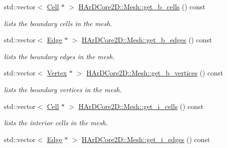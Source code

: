 \begin{DoxyCompactItemize}
\mbox{\label{group__Mesh_gaf5cd4923da2e5abbe05c0f473e3b9c8f}} 
std\+::vector$<$ \hyperlink{classHArDCore2D_1_1Cell}{Cell} $\ast$ $>$ \hyperlink{group__Mesh_gaf5cd4923da2e5abbe05c0f473e3b9c8f}{H\+Ar\+D\+Core2\+D\+::\+Mesh\+::get\+\_\+b\+\_\+cells} () const
\begin{DoxyCompactList}\small\item\em lists the boundary cells in the mesh. \end{DoxyCompactList}\item 
\mbox{\label{group__Mesh_gad876c80b23ab0c0d490b5dc8a60172b4}} 
std\+::vector$<$ \hyperlink{classHArDCore2D_1_1Edge}{Edge} $\ast$ $>$ \hyperlink{group__Mesh_gad876c80b23ab0c0d490b5dc8a60172b4}{H\+Ar\+D\+Core2\+D\+::\+Mesh\+::get\+\_\+b\+\_\+edges} () const
\begin{DoxyCompactList}\small\item\em lists the boundary edges in the mesh. \end{DoxyCompactList}\item 
\mbox{\label{group__Mesh_ga32dead5e72501d5001fd83aaa7379173}} 
std\+::vector$<$ \hyperlink{classHArDCore2D_1_1Vertex}{Vertex} $\ast$ $>$ \hyperlink{group__Mesh_ga32dead5e72501d5001fd83aaa7379173}{H\+Ar\+D\+Core2\+D\+::\+Mesh\+::get\+\_\+b\+\_\+vertices} () const
\begin{DoxyCompactList}\small\item\em lists the boundary vertices in the mesh. \end{DoxyCompactList}\item 
\mbox{\label{group__Mesh_gab962f4a1a88c7f4910a5e555e01064f3}} 
std\+::vector$<$ \hyperlink{classHArDCore2D_1_1Cell}{Cell} $\ast$ $>$ \hyperlink{group__Mesh_gab962f4a1a88c7f4910a5e555e01064f3}{H\+Ar\+D\+Core2\+D\+::\+Mesh\+::get\+\_\+i\+\_\+cells} () const
\begin{DoxyCompactList}\small\item\em lists the interior cells in the mesh. \end{DoxyCompactList}\item 
\mbox{\label{group__Mesh_gabaaffe0b8981c9dab16ae34d63262638}} 
std\+::vector$<$ \hyperlink{classHArDCore2D_1_1Edge}{Edge} $\ast$ $>$ \hyperlink{group__Mesh_gabaaffe0b8981c9dab16ae34d63262638}{H\+Ar\+D\+Core2\+D\+::\+Mesh\+::get\+\_\+i\+\_\+edges} () const

\end{DoxyCompactItemize}
